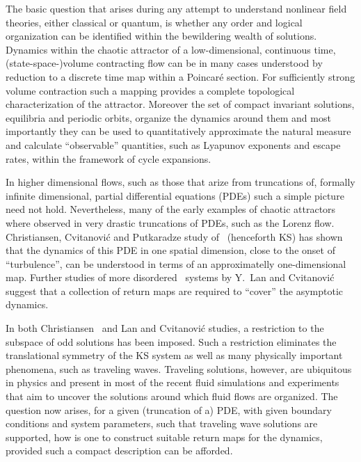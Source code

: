 
The basic question that arises during any attempt to understand
nonlinear field theories, either classical or
quantum, is whether any order and logical organization can be
identified within the bewildering wealth of solutions. Dynamics
within the chaotic attractor of a low-dimensional, continuous
time, (state-space-)volume contracting flow can be in many
cases understood by reduction to a discrete time map within a
Poincar\'e section. For sufficiently strong volume contraction
such a mapping provides a complete topological characterization
of the attractor. Moreover the set of compact
invariant solutions, equilibria and periodic orbits, organize
the dynamics around them and most importantly they can be used
to quantitatively approximate the natural measure and calculate
``observable'' quantities, such as Lyapunov exponents and
escape rates, within the framework of cycle
expansions.

In higher dimensional flows, such as those that arize from truncations of, formally
infinite dimensional, partial differential equations (PDEs) such a simple picture
need not hold. Nevertheless, many of the early examples of chaotic attractors where
observed in very drastic truncations of PDEs, such as the Lorenz flow.
Christiansen, Cvitanovi\'{c} and Putkaradze study of 
\KSe\ (henceforth KS) has shown that the dynamics of this PDE in one spatial dimension, close to the 
onset of ``turbulence'', can be understood in terms of an approximatelly one-dimensional map.
Further studies of more disordered \KS\ systems by Y.~Lan and Cvitanovi\'{c}
suggest that a collection of return maps are required to ``cover'' the asymptotic dynamics.

In both Christiansen \etal\ and Lan and Cvitanovi\'{c} studies, a restriction to the 
subspace of odd solutions has been imposed. Such a restriction eliminates the translational 
symmetry of the KS system as well as many physically important phenomena, such as
traveling waves. Traveling solutions, however, are ubiquitous in physics and present 
in most of the recent fluid simulations 
and experiments 
that aim to uncover the solutions around which fluid flows are organized.
The question now arises, for a given (truncation of a) PDE, with
given boundary conditions and system parameters, such that
traveling wave solutions are supported, how is one to construct suitable return maps
for the dynamics, provided such a compact description can be afforded.

